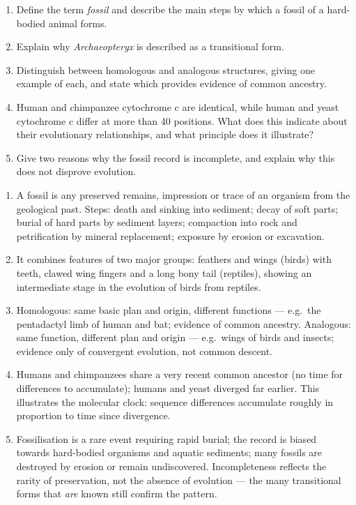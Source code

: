 \documentclass[11pt]{article}
\begin{document}
\begin{exercice}
\begin{enumerate}
\item Define the term \emph{fossil} and describe the main steps by which a fossil of a hard-bodied animal forms.
\item Explain why \emph{Archaeopteryx} is described as a transitional form.
\item Distinguish between homologous and analogous structures, giving one example of each, and state which provides evidence of common ancestry.
\item Human and chimpanzee cytochrome c are identical, while human and yeast cytochrome c differ at more than 40 positions. What does this indicate about their evolutionary relationships, and what principle does it illustrate?
\item Give two reasons why the fossil record is incomplete, and explain why this does not disprove evolution.
\end{enumerate}
\end{exercice}

\begin{corrige}[Exercise 1]
\begin{enumerate}
\item A fossil is any preserved remains, impression or trace of an organism from the geological past. Steps: death and sinking into sediment; decay of soft parts; burial of hard parts by sediment layers; compaction into rock and petrification by mineral replacement; exposure by erosion or excavation.
\item It combines features of two major groups: feathers and wings (birds) with teeth, clawed wing fingers and a long bony tail (reptiles), showing an intermediate stage in the evolution of birds from reptiles.
\item Homologous: same basic plan and origin, different functions — e.g.\ the pentadactyl limb of human and bat; evidence of common ancestry. Analogous: same function, different plan and origin — e.g.\ wings of birds and insects; evidence only of convergent evolution, not common descent.
\item Humans and chimpanzees share a very recent common ancestor (no time for differences to accumulate); humans and yeast diverged far earlier. This illustrates the molecular clock: sequence differences accumulate roughly in proportion to time since divergence.
\item Fossilisation is a rare event requiring rapid burial; the record is biased towards hard-bodied organisms and aquatic sediments; many fossils are destroyed by erosion or remain undiscovered. Incompleteness reflects the rarity of preservation, not the absence of evolution — the many transitional forms that \emph{are} known still confirm the pattern.
\end{enumerate}
\end{corrige}
\end{document}
